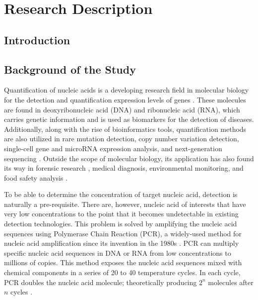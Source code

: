 \chapter{Research Description}
\label{sec:researchdesc} 

\section{Introduction}
\label{sec:introduction}

\section{Background of the Study}
\label{sec:backgroundstudy}

Quantification of nucleic acids is a developing research field in molecular biology for the detection and quantification expression levels of genes \cite{Huggett2015_PCR_NGS}. These molecules are found in deoxyribonucleic acid (DNA) and ribonucleic acid (RNA), which carries genetic information and is used as biomarkers for the detection of diseases. Additionally, along with the rise of bioinformatics tools, quantification methods are also utilized in rare mutation detection, copy number variation detection, single-cell gene and microRNA expression analysis, and next-generation sequencing \cite{Quan2018}. Outside the scope of molecular biology, its application has also found its way in forensic research \cite{Whale2013}, medical diagnosis, environmental monitoring, and food safety analysis \cite{Cao2017}.


To be able to determine the concentration of target nucleic acid, detection is naturally a pre-requisite. There are, however, nucleic acid of interests that have very low concentrations to the point that it becomes undetectable in existing detection technologies. This problem is solved by amplifying the nucleic acid sequences using Polymerase Chain Reaction (PCR), a widely-used method for nucleic acid amplification since its invention in the 1980s \cite{Cao2017}. PCR can multiply specific nucleic acid sequences in DNA or RNA from low concentrations to millions of copies. This method exposes the nucleic acid sequences mixed with chemical components in a series of 20 to 40 temperature cycles. In each cycle, PCR doubles the nucleic acid molecule; theoretically producing \(2^n\) molecules after \(n\) cycles \cite{Quan2018}.

